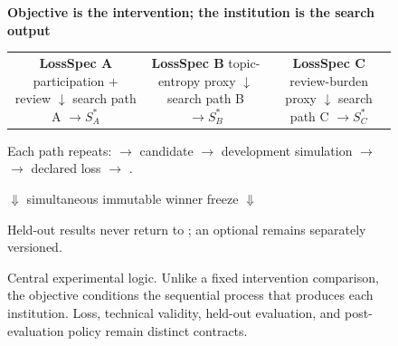 \begin{figure}[t]
\centering
\setlength{\fboxsep}{5pt}
\begin{minipage}{0.98\linewidth}
\small
\centering
\textbf{Objective is the intervention; the institution is the search output}

\vspace{4pt}
\begin{tabular}{ccc}
\fbox{\parbox{0.27\linewidth}{\centering
\textbf{LossSpec A}\\participation $+$ review\\
$\downarrow$\\search path A $\rightarrow S_A^*$}}
&
\fbox{\parbox{0.27\linewidth}{\centering
\textbf{LossSpec B}\\topic-entropy proxy\\
$\downarrow$\\search path B $\rightarrow S_B^*$}}
&
\fbox{\parbox{0.27\linewidth}{\centering
\textbf{LossSpec C}\\review-burden proxy\\
$\downarrow$\\search path C $\rightarrow S_C^*$}}
\end{tabular}

\vspace{5pt}
Each path repeats:  $\rightarrow$ candidate \systemspec{}
$\rightarrow$ development simulation $\rightarrow$ 
$\rightarrow$ declared loss $\rightarrow$ .

\vspace{4pt}
$\Downarrow$ simultaneous immutable winner freeze $\Downarrow$

\vspace{4pt}

\vspace{3pt}
Held-out results never return to ; an optional
 remains separately versioned.
\end{minipage}
\caption{Central experimental logic. Unlike a fixed intervention comparison,
the objective conditions the sequential process that produces each institution.
Loss, technical validity, held-out evaluation, and post-evaluation policy remain
distinct contracts.}
\label{fig:metric-conditioned-methods-flow}
\end{figure}
